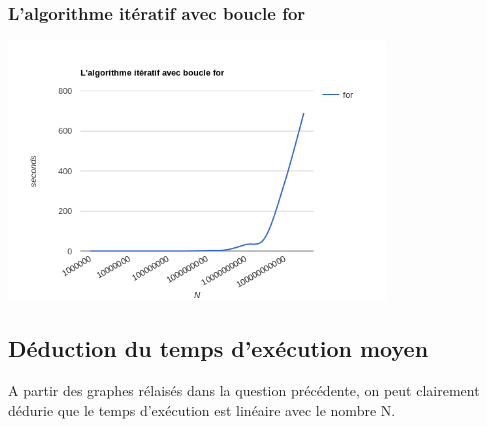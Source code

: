 \documentclass[•]{article}
\begin{document}
\subsubsection{L'algorithme itératif avec boucle for}
\includegraphics[width=0.75\textwidth]{for.png}
\subsection{Déduction du temps d'exécution moyen}
A partir des graphes rélaisés dans la question précédente, on peut clairement dédurie que le temps d'exécution est linéaire avec le nombre N.
\end{document}
